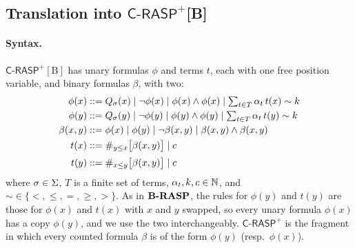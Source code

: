 \subsection{Translation into \texorpdfstring{$\mathsf{C\text{-}RASP}^+$[B]}{C-RASP+[B]}}

\providecommand{\bcount}[3]{\#_{#1\leq #2}\bigl[#3\bigr]}

\paragraph{Syntax.}
$\mathsf{C\text{-}RASP}^+[\mathrm{B}]$ has unary formulas $\phi$ and terms $t$, each with one free position variable,
and binary formulas $\beta$, with two:
\begin{align*}
    \phi(x) & \bnfto Q_\sigma(x) \mid \lnot \phi(x) \mid \phi(x)\land \phi(x) \mid \textstyle\sum_{t\in T}\alpha_t\, t(x)\sim k \\
    \phi(y) & \bnfto Q_\sigma(y) \mid \lnot \phi(y) \mid \phi(y)\land \phi(y) \mid \textstyle\sum_{t\in T}\alpha_t\, t(y)\sim k \\
    \beta(x,y) & \bnfto \phi(x) \mid \phi(y) \mid \lnot \beta(x,y) \mid \beta(x,y)\land \beta(x,y)\\
    t(x) & \bnfto \bcount{y}{x}{\beta(x,y)} \mid c \\[2pt]
    t(y) & \bnfto \bcount{x}{y}{\beta(x,y)} \mid c 
\end{align*}
where $\sigma\in{{ \Sigma}}$, $T$ is a finite set of terms, $\alpha_t,k,c\in{{ \mathbb{N}}}$, and ${\sim}\in\{<,\leq,=,\geq,>\}$.
As in ${\textbf{B-RASP}}$, the rules for $\phi(y)$ and $t(y)$ are those for $\phi(x)$ and $t(x)$ with $x$ and $y$ swapped,
so every unary formula $\phi(x)$ has a copy $\phi(y)$, and we use the two interchangeably.
$\mathsf{C\text{-}RASP}^+$ is the fragment in which every counted formula $\beta$ is of the form $\phi(y)$ (resp.\ $\phi(x)$).

